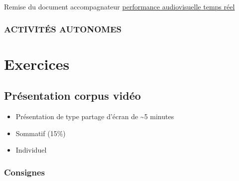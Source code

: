 \documentclass[
]{book}
\providecommand{\tightlist}{%
  \setlength{\itemsep}{0pt}\setlength{\parskip}{0pt}}
\begin{document}
Remise du document accompagnateur \protect\hyperlink{sommatif_5}{performance audiovisuelle temps réel}

\hypertarget{activituxe9s-autonomes-17}{%
\subsection{ACTIVITÉS AUTONOMES}\label{activituxe9s-autonomes-17}}

\hypertarget{exercices}{%
\chapter{Exercices}\label{exercices}}

\hypertarget{sommatif_1}{%
\section{Présentation corpus vidéo}\label{sommatif_1}}

\begin{itemize}
\tightlist
\item
  Présentation de type partage d'écran de \textasciitilde5 minutes
\item
  Sommatif (15\%)
\item
  Individuel
\end{itemize}

\hypertarget{consignes}{%
\subsection{Consignes}\label{consignes}}
\end{document}
